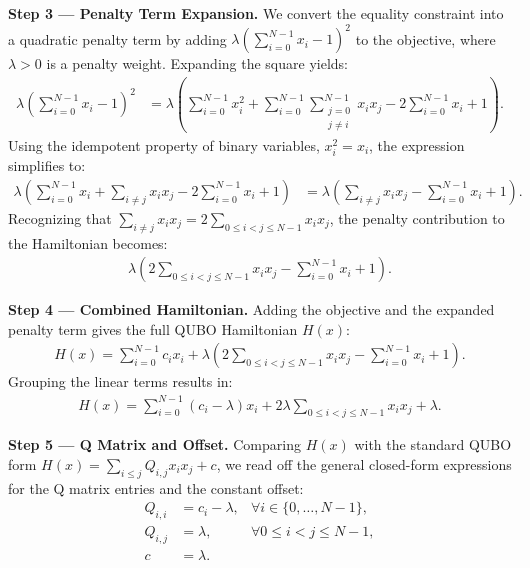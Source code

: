 \documentclass[12pt]{article}
\begin{document}
\textbf{Step 3 --- Penalty Term Expansion.} We convert the equality constraint into a quadratic penalty term by adding $\lambda \left( \sum_{i=0}^{N-1} x_i - 1 \right)^2$ to the objective, where $\lambda > 0$ is a penalty weight. Expanding the square yields:
\begin{align}
\lambda \left( \sum_{i=0}^{N-1} x_i - 1 \right)^2 &= \lambda \left( \sum_{i=0}^{N-1} x_i^2 + \sum_{i=0}^{N-1} \sum_{\substack{j=0 \\ j \neq i}}^{N-1} x_i x_j - 2 \sum_{i=0}^{N-1} x_i + 1 \right).
\end{align}
Using the idempotent property of binary variables, $x_i^2 = x_i$, the expression simplifies to:
\begin{align}
\lambda \left( \sum_{i=0}^{N-1} x_i + \sum_{i \neq j} x_i x_j - 2 \sum_{i=0}^{N-1} x_i + 1 \right) &= \lambda \left( \sum_{i \neq j} x_i x_j - \sum_{i=0}^{N-1} x_i + 1 \right).
\end{align}
Recognizing that $\sum_{i \neq j} x_i x_j = 2 \sum_{0 \le i < j \le N-1} x_i x_j$, the penalty contribution to the Hamiltonian becomes:
\begin{align}
\lambda \left( 2 \sum_{0 \le i < j \le N-1} x_i x_j - \sum_{i=0}^{N-1} x_i + 1 \right).
\end{align}

\textbf{Step 4 --- Combined Hamiltonian.} Adding the objective and the expanded penalty term gives the full QUBO Hamiltonian $H(x)$:
\begin{align}
H(x) = \sum_{i=0}^{N-1} c_i x_i + \lambda \left( 2 \sum_{0 \le i < j \le N-1} x_i x_j - \sum_{i=0}^{N-1} x_i + 1 \right).
\end{align}
Grouping the linear terms results in:
\begin{align}
H(x) = \sum_{i=0}^{N-1} (c_i - \lambda) x_i + 2\lambda \sum_{0 \le i < j \le N-1} x_i x_j + \lambda.
\end{align}

\textbf{Step 5 --- Q Matrix and Offset.} Comparing $H(x)$ with the standard QUBO form $H(x) = \sum_{i \le j} Q_{i,j} x_i x_j + c$, we read off the general closed-form expressions for the Q matrix entries and the constant offset:
\begin{align}
Q_{i,i} &= c_i - \lambda, & \forall i \in \{0, \dots, N-1\}, \\
Q_{i,j} &= \lambda, & \forall 0 \le i < j \le N-1, \\
c &= \lambda. &
\end{align}
\end{document}
